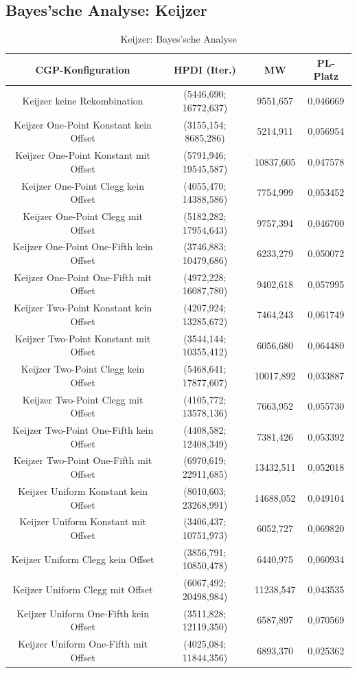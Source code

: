 \subsection{Bayes'sche Analyse: Keijzer}
\label{subsec:bayesKeijzer}

\begin{table}[H]
	\centering
	\begin{tabular}{c | c | c | c}
		\textbf{CGP-Konfiguration} & \textbf{HPDI (Iter.)} & \textbf{MW} & \textbf{PL-Platz}\\
		\hline
		Keijzer keine Rekombination & (5446,690; 16772,637) & 9551,657 & 0,046669\\
		\hline
		Keijzer One-Point Konstant kein Offset & (3155,154; 8685,286) & 5214,911 & 0,056954\\
		\hline
		Keijzer One-Point Konstant mit Offset & (5791,946; 19545,587) & 10837,605 & 0,047578\\
		\hline
		Keijzer One-Point Clegg kein Offset & (4055,470; 14388,586) & 7754,999 & 0,053452\\
		\hline
		Keijzer One-Point Clegg mit Offset & (5182,282; 17954,643) & 9757,394 & 0,046700\\
		\hline
		Keijzer One-Point One-Fifth kein Offset & (3746,883; 10479,686) & 6233,279 & 0,050072\\
		\hline
		Keijzer One-Point One-Fifth mit Offset & (4972,228; 16087,780) & 9402,618 & 0,057995\\
		\hline
		Keijzer Two-Point Konstant kein Offset & (4207,924; 13285,672) & 7464,243 & 0,061749\\
		\hline
		Keijzer Two-Point Konstant mit Offset & (3544,144; 10355,412) & 6056,680 & 0,064480\\
		\hline
		Keijzer Two-Point Clegg kein Offset & (5468,641; 17877,607) & 10017,892 & 0,033887\\
		\hline
		Keijzer Two-Point Clegg mit Offset & (4105,772; 13578,136) & 7663,952 & 0,055730\\
		\hline
		Keijzer Two-Point One-Fifth kein Offset & (4408,582; 12408,349) & 7381,426 & 0,053392\\
		\hline
		Keijzer Two-Point One-Fifth mit Offset & (6970,619; 22911,685) & 13432,511 & 0,052018\\
		\hline
		Keijzer Uniform Konstant kein Offset & (8010,603; 23268,991) & 14688,052 & 0,049104\\
		\hline
		Keijzer Uniform Konstant mit Offset & (3406,437; 10751,973) & 6052,727 & 0,069820\\
		\hline
		Keijzer Uniform Clegg kein Offset & (3856,791; 10850,478) & 6440,975 & 0,060934\\
		\hline
		Keijzer Uniform Clegg mit Offset & (6067,492; 20498,984) & 11238,547 & 0,043535\\
		\hline
		Keijzer Uniform One-Fifth kein Offset & (3511,828; 12119,350) & 6587,897 & 0,070569\\
		\hline
		Keijzer Uniform One-Fifth mit Offset & (4025,084; 11844,356) & 6893,370 & 0,025362\\
	\end{tabular}
	\label{table:keijzerBayesian}
	\caption{Keijzer: Bayes'sche Analyse}
\end{table}

